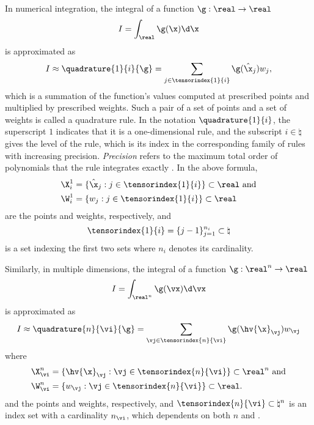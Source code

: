 In numerical integration, the integral of a function $\g: \real \to \real$
\[
  I = \int_\real \g(\x) \d \x
\]
is approximated as
\[
  I \approx \quadrature{1}{i}{\g} = \sum_{j \in \tensorindex{1}{i}} \g(\hat{\x}_j) w_j,
\]
which is a summation of the function's values computed at prescribed points and
multiplied by prescribed weights. Such a pair of a set of points and a set of
weights is called a quadrature rule. In the notation $\quadrature{1}{i}$, the
superscript $1$ indicates that it is a one-dimensional rule, and the subscript
$i \in \natural$ gives the level of the rule, which is its index in the
corresponding family of rules with increasing precision. \emph{Precision} refers
to the maximum total order of polynomials that the rule integrates exactly
\cite{heiss2008}. In the above formula,
\[
  \begin{split}
    & \X^1_i = \{ \hat{\x}_j: j \in \tensorindex{1}{i} \} \subset \real \text{ and} \\
    & \W^1_i = \{ w_j: j \in \tensorindex{1}{i} \} \subset \real
  \end{split}
\]
are the points and weights, respectively, and
\[
  \tensorindex{1}{i} = \{ j - 1 \}_{j = 1}^{n_i} \subset \natural
\]
is a set indexing the first two sets where $n_i$ denotes its cardinality.

Similarly, in multiple dimensions, the integral of a function $\g: \real^n \to
\real$
\[
  I = \int_{\real^n} \g(\vx) \d \vx
\]
is approximated as
\[
  I \approx \quadrature{n}{\vi}{\g} = \sum_{\vj \in \tensorindex{n}{\vi}} \g(\hv{\x}_{\vj}) w_{\vj}
\]
where
\[
  \begin{split}
    & \X^n_{\vi} = \{ \hv{\x}_{\vj}: \vj \in \tensorindex{n}{\vi} \} \subset \real^n \text{ and} \\
    & \W^n_{\vi} = \{ w_{\vj}: \vj \in \tensorindex{n}{\vi} \} \subset \real. \\
  \end{split}
\]
and the points and weights, respectively, and $\tensorindex{n}{\vi} \subset
\natural^n$ is an index set with a cardinality $n_{\vi}$, which dependents on
both $n$ and \vi.

